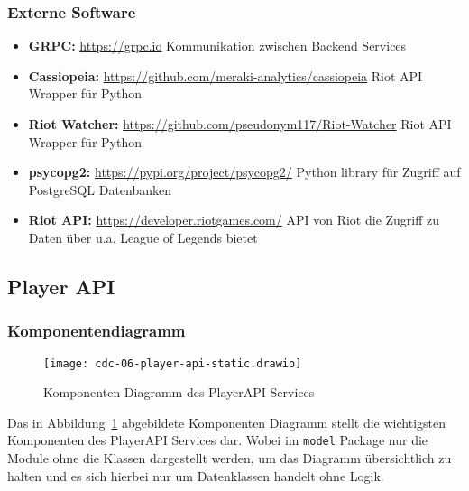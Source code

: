\subsubsection{Externe Software}
\begin{itemize}

\item \textbf{GRPC:} \href{https://grpc.io/docs/languages/python/basics/}{https://grpc.io} Kommunikation zwischen Backend Services\\
\item \textbf{Cassiopeia:} \href{https://github.com/meraki-analytics/cassiopeia}{https://github.com/meraki-analytics/cassiopeia} Riot API Wrapper für Python\\
\item \textbf{Riot Watcher:} \href{https://github.com/pseudonym117/Riot-Watcher}{https://github.com/pseudonym117/Riot-Watcher} Riot API Wrapper für Python\\
\item \textbf{psycopg2:} \href{https://pypi.org/project/psycopg2/}{https://pypi.org/project/psycopg2/} Python library für Zugriff auf PostgreSQL Datenbanken \\
\item \textbf{Riot API:} \href{https://developer.riotgames.com/}{https://developer.riotgames.com/} API von Riot die Zugriff zu Daten über u.a. League of Legends bietet\\

\end{itemize}

\subsection{Player API}

\subsubsection{Komponentendiagramm}\label{subsubsec:player-api-component-diagram}

\begin{figure}
    \centering
    \texttt{[image: cdc-06-player-api-static.drawio]}
    \caption{Komponenten Diagramm des PlayerAPI Services}
    \label{fig:player-api-component-diagram}
\end{figure}
Das in Abbildung~\ref{fig:player-api-component-diagram} abgebildete Komponenten Diagramm stellt die wichtigsten
Komponenten des PlayerAPI Services dar.
Wobei im \lstinline!model! Package nur die Module ohne die Klassen dargestellt werden, um das Diagramm
übersichtlich zu halten und es sich hierbei nur um Datenklassen handelt ohne Logik.

